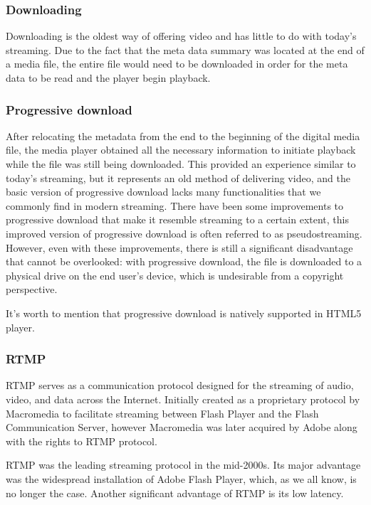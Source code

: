 \documentclass{article}
\begin{document}
\subsubsection{Downloading}\label{downloading}

Downloading is the oldest way of offering video and has little to do
with today's streaming. Due to the fact that the meta data summary was
located at the end of a media file, the entire file would need to be
downloaded in order for the meta data to be read and the player begin
playback.

\subsubsection{Progressive download}\label{progressive-download}

After relocating the metadata from the end to the beginning of the
digital media file, the media player obtained all the necessary
information to initiate playback while the file was still being
downloaded. This provided an experience similar to today's streaming,
but it represents an old method of delivering video, and the basic
version of progressive download lacks many functionalities that we
commonly find in modern streaming. There have been some improvements to
progressive download that make it resemble streaming to a certain
extent, this improved version of progressive download is often referred
to as pseudostreaming. However, even with these improvements, there is
still a significant disadvantage that cannot be overlooked: with
progressive download, the file is downloaded to a physical drive on the
end user's device, which is undesirable from a copyright perspective.

It's worth to mention that progressive download is natively supported in
HTML5 player.

\subsubsection{RTMP}\label{rtmp}

RTMP serves as a communication protocol designed for the streaming of
audio, video, and data across the Internet. Initially created as a
proprietary protocol by Macromedia to facilitate streaming between Flash
Player and the Flash Communication Server, however Macromedia was later
acquired by Adobe along with the rights to RTMP protocol.

RTMP was the leading streaming protocol in the mid-2000s. Its major
advantage was the widespread installation of Adobe Flash Player, which,
as we all know, is no longer the case. Another significant advantage of
RTMP is its low latency.
\end{document}
